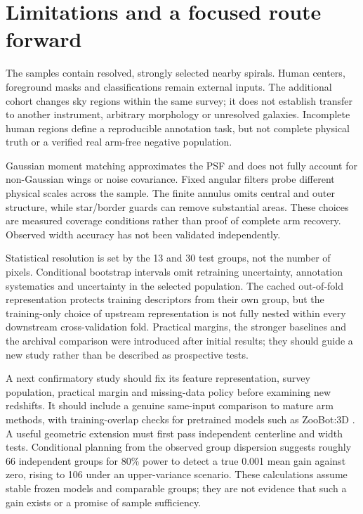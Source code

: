 \documentclass[11pt]{article}
\begin{document}
\section{Limitations and a focused route forward}
The samples contain resolved, strongly selected nearby spirals. Human centers,
foreground masks and classifications remain external inputs. The additional
cohort changes sky regions within the same survey; it does not establish
transfer to another instrument, arbitrary morphology or unresolved galaxies.
Incomplete human regions define a reproducible annotation task, but not
complete physical truth or a verified real arm-free negative population.

Gaussian moment matching approximates the PSF and does not fully account for
non-Gaussian wings or noise covariance. Fixed angular filters probe different
physical scales across the sample. The finite annulus omits central and outer
structure, while star/border guards can remove substantial areas. These choices
are measured coverage conditions rather than proof of complete arm recovery.
Observed width accuracy has not been validated independently.

Statistical resolution is set by the 13 and 30 test groups, not the number
of pixels. Conditional bootstrap intervals omit retraining uncertainty,
annotation systematics and uncertainty in the selected population. The cached
out-of-fold representation protects training descriptors from their own group,
but the training-only choice of upstream representation is not fully nested
within every downstream cross-validation fold. Practical margins, the stronger
baselines and the archival comparison were introduced after initial results;
they should guide a new study rather than be described as prospective tests.

A next confirmatory study should fix its feature representation, survey
population, practical margin and missing-data policy before examining new
redshifts. It should include a genuine same-input comparison to mature arm
methods, with training-overlap checks for pretrained models such as ZooBot:3D
\citep{spindler2026}. A useful geometric extension must first pass independent
centerline and width tests. Conditional planning from the observed group
dispersion suggests roughly 66 independent groups for 80\% power to detect a
true 0.001 mean gain against zero, rising to 106 under an upper-variance
scenario. These calculations assume stable frozen models and comparable groups;
they are not evidence that such a gain exists or a promise of sample sufficiency.
\end{document}
